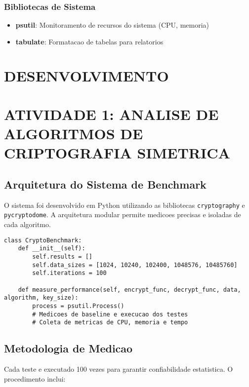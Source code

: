 \documentclass[12pt,a4paper,oneside]{article}
\begin{document}
\subsubsection{Bibliotecas de Sistema}

\begin{itemize}
    \item \textbf{psutil}: Monitoramento de recursos do sistema (CPU, memoria)
    \item \textbf{tabulate}: Formatacao de tabelas para relatorios
\end{itemize}

\section{DESENVOLVIMENTO}

\section{ATIVIDADE 1: ANALISE DE ALGORITMOS DE CRIPTOGRAFIA SIMETRICA}

\subsection{Arquitetura do Sistema de Benchmark}

O sistema foi desenvolvido em Python utilizando as bibliotecas \texttt{cryptography} e \texttt{pycryptodome}. A arquitetura modular permite medicoes precisas e isoladas de cada algoritmo.

\begin{lstlisting}[caption=Estrutura principal da classe CryptoBenchmark]
class CryptoBenchmark:
    def __init__(self):
        self.results = []
        self.data_sizes = [1024, 10240, 102400, 1048576, 10485760]
        self.iterations = 100
    
    def measure_performance(self, encrypt_func, decrypt_func, data, algorithm, key_size):
        process = psutil.Process()
        # Medicoes de baseline e execucao dos testes
        # Coleta de metricas de CPU, memoria e tempo
\end{lstlisting}

\subsection{Metodologia de Medicao}

Cada teste e executado 100 vezes para garantir confiabilidade estatistica. O procedimento inclui:
\end{document}

